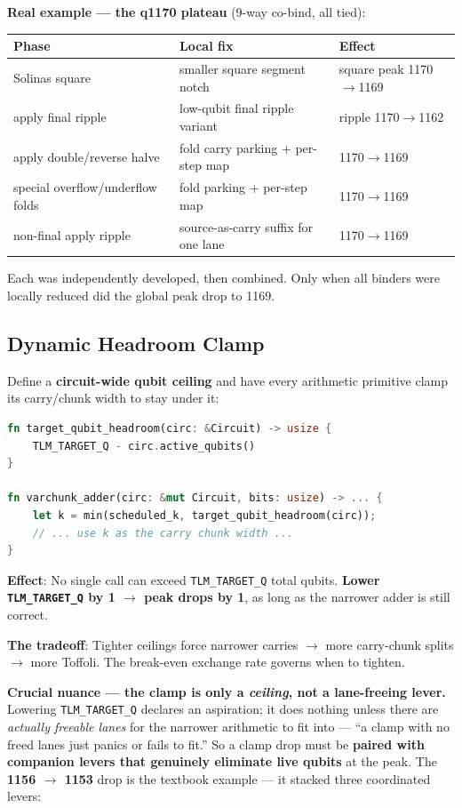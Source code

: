 \documentclass[11pt,a4paper]{article}
\begin{document}
\textbf{Real example --- the q1170 plateau} (9-way co-bind, all tied):
\begin{center}
\begin{tabular}{p{4.5cm}p{5.5cm}p{3cm}}
\toprule
\textbf{Phase} & \textbf{Local fix} & \textbf{Effect} \\
\midrule
Solinas square & smaller square segment notch & square peak 1170$\to$1169 \\
apply final ripple & low-qubit final ripple variant & ripple 1170$\to$1162 \\
apply double/reverse halve & fold carry parking + per-step map & 1170$\to$1169 \\
special overflow/underflow folds & fold parking + per-step map & 1170$\to$1169 \\
non-final apply ripple & source-as-carry suffix for one lane & 1170$\to$1169 \\
\bottomrule
\end{tabular}
\end{center}
Each was independently developed, then combined. Only when all binders were locally reduced
did the global peak drop to 1169.

\subsection{Dynamic Headroom Clamp}

Define a \textbf{circuit-wide qubit ceiling} and have every arithmetic primitive clamp its
carry/chunk width to stay under it:

\begin{lstlisting}[language=Rust]
fn target_qubit_headroom(circ: &Circuit) -> usize {
    TLM_TARGET_Q - circ.active_qubits()
}

fn varchunk_adder(circ: &mut Circuit, bits: usize) -> ... {
    let k = min(scheduled_k, target_qubit_headroom(circ));
    // ... use k as the carry chunk width ...
}
\end{lstlisting}

\textbf{Effect}: No single call can exceed \texttt{TLM\_TARGET\_Q} total qubits.
\textbf{Lower \texttt{TLM\_TARGET\_Q} by 1 $\to$ peak drops by 1}, as long as the narrower
adder is still correct.

\textbf{The tradeoff}: Tighter ceilings force narrower carries $\to$ more carry-chunk splits $\to$
more Toffoli. The break-even exchange rate governs when to tighten.

\textbf{Crucial nuance --- the clamp is only a \emph{ceiling}, not a lane-freeing lever.} Lowering
\texttt{TLM\_TARGET\_Q} declares an aspiration; it does nothing unless there are \emph{actually
freeable lanes} for the narrower arithmetic to fit into --- ``a clamp with no freed lanes just
panics or fails to fit.'' So a clamp drop must be \textbf{paired with companion levers that genuinely
eliminate live qubits} at the peak. The \textbf{1156 $\to$ 1153} drop is the textbook example --- it
stacked three coordinated levers:
\end{document}

